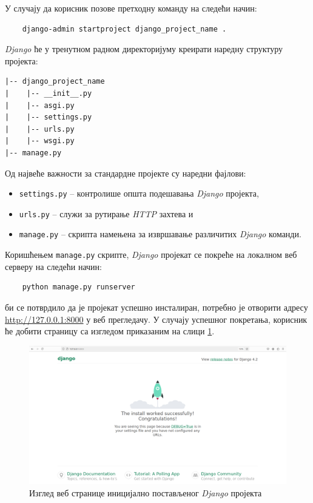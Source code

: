 \documentclass[12pt,oneside]{memoir}
\begin{document}
У случају да корисник позове претходну команду на следећи начин:
\begin{lstlisting}
    django-admin startproject django_project_name .
\end{lstlisting}

\noindent \textit{Django} ће у тренутном радном директоријуму креирати наредну структуру пројекта:
\begin{lstlisting}
|-- django_project_name
|    |-- __init__.py
|    |-- asgi.py
|    |-- settings.py
|    |-- urls.py
|    |-- wsgi.py
|-- manage.py
\end{lstlisting}

Од највеће важности за стандардне пројекте су наредни фајлови:
\begin{itemize}[--]
    \item \texttt{settings.py} -- контролише општа подешавања \textit{Django} пројекта,
    \item \texttt{urls.py} -- служи за рутирање \textit{HTTP} захтева и
    \item \texttt{manage.py} --  скрипта намењена за извршавање различитих \textit{Django} команди.
\end{itemize}

Коришћењем \texttt{manage.py} скрипте, \textit{Django} пројекат се покреће на локалном веб серверу на следећи начин:
\begin{lstlisting}
    python manage.py runserver
\end{lstlisting}

 би се потврдило да је пројекат успешно инсталиран, потребно је отворити адресу \url{http://127.0.0.1:8000} у веб прегледачу. У случају успешног покретања, корисник ће добити страницу са изгледом приказаним на слици \ref{pic:django_initial_run}.

\begin{figure}[h]
  \centering
  \includegraphics[scale=0.22]{assets/pictures/django_initial_project_run.png}
  \caption{Изглед веб странице иницијално постављеног \textit{Django} пројекта}
  \label{pic:django_initial_run}
\end{figure}
\end{document}
